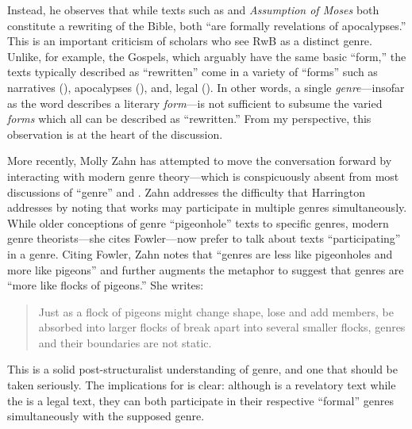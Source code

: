 Instead, he observes that while texts such as \jub and
\emph{Assumption of Moses} both constitute a rewriting of the Bible,
both ``are formally revelations of
apocalypses.''\autocite[243]{harrington_kraft-nickelsburg1986} This is
an important criticism of scholars who see RwB as a distinct genre.
Unlike, for example, the Gospels, which arguably have the same basic
``form,'' the texts typically described as ``rewritten'' come in a
variety of ``forms'' such as narratives (\ga),
apocalypses (\jub), and, legal
(\templescroll). In other words, a single
\emph{genre}---insofar as the word describes a literary \emph{form}---is
not sufficient to subsume the varied \emph{forms} which all can be
described as ``rewritten.'' From my perspective, this observation is at
the heart of the discussion.

More recently, Molly Zahn has attempted to move the conversation forward
by interacting with modern genre theory---which is conspicuously absent
from most discussions of ``genre'' and
\rwb.\autocites{zahn_jbl2012}[Daniel Machiela noted the
absence of genre theory in his 2010 article, as well,
see][]{machiela_jjs2010}[Notable exceptions include][]{brooke_dsd2010}
Zahn addresses the difficulty that Harrington addresses by noting that
works may participate in multiple genres simultaneously. While older
conceptions of genre ``pigeonhole'' texts to specific genres, modern
genre theorists---she cites Fowler---now prefer to talk about texts
``participating'' in a genre. Citing Fowler, Zahn notes that ``genres
are less like pigeonholes and more like pigeons'' and further augments
the metaphor to suggest that genres are ``more like flocks of pigeons.''
She writes:

\begin{quote}
Just as a flock of pigeons might change shape, lose and add members, be
absorbed into larger flocks of break apart into several smaller flocks,
genres and their boundaries are not static.\autocite[277]{zahn_jbl2012}
\end{quote}

This is a solid post-structuralist understanding of genre, and one that
should be taken seriously. The implications for \rwb is
clear: although \jub is a revelatory text while the
\templescroll is a legal text, they can both
participate in their respective ``formal'' genres simultaneously with
the supposed \rwb genre.\autocites[Zahn also explores
the ``functional'' aspects of genre. She notes that genres are ``not
simply systems of classifications developed and used by literary
critics, but are fundamental to all human
communication.''][280]{zahn_jbl2012}[Thus, genres manifest as common
patterns recognized by both the author and the reader which aid
communication and in this way, genre functions as a sort of ``literary
body language.''][276]{zahn_jbl2012}[See also][199]{newsom_grossman2010}

